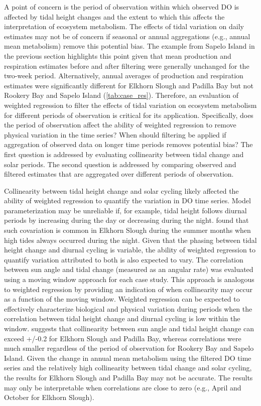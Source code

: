 \documentclass[letterpaper,12pt,oneside]{article}\usepackage[]{graphicx}\usepackage[]{color}
\begin{document}
A point of concern is the period of observation within which observed \ac{DO} is affected by tidal height changes and the extent to which this affects the interpretation of ecosystem metabolism.  The effects of tidal variation on daily estimates may not be of concern if seasonal or annual aggregations (e.g., annual mean metabolism) remove this potential bias.  The example from Sapelo Island in the previous section highlights this point given that mean production and respiration estimates before and after filtering were generally unchanged for the two-week period. Alternatively, annual averages of production and respiration estimates were significantly different for Elkhorn Slough and Padilla Bay but not Rookery Bay and Sapelo Island (\cref{tab:case_res}).  Therefore, an evaluation of weighted regression to filter the effects of tidal variation on ecosystem metabolism for different periods of observation is critical for its application.  Specifically, does the period of observation affect the ability of weighted regression to remove physical variation in the time series?  When should filtering be applied if aggregation of observed data on longer time periods removes potential bias?  The first question is addressed by evaluating collinearity between tidal change and solar periods.  The second question is addressed by comparing observed and filtered estimates that are aggregated over different periods of observation.

Collinearity between tidal height change and solar cycling likely affected the ability of weighted regression to quantify the variation in \ac{DO} time series.  Model parameterization may be unreliable if, for example, tidal height follows diurnal periods by increasing during the day or decreasing during the night.  \citet{Nidzieko14} found that such covariation is common in Elkhorn Slough during the summer months when high tides always occurred during the night.  Given that the phasing between tidal height change and diurnal cycling is variable, the ability of weighted regression to quantify variation attributed to both is also expected to vary.   The correlation between sun angle and tidal change (measured as an angular rate) was evaluated using a moving window approach for each case study.  This approach is analogous to weighted regression by providing an indication of when collinearity may occur as a function of the moving window.  Weighted regression can be expected to effectively characterize biological and physical variation during periods when the correlation between tidal height change and diurnal cycling is low within the window.   suggests that collinearity between sun angle and tidal height change can exceed +/-0.2 for Elkhorn Slough and Padilla Bay, whereas correlations were much smaller regardless of the period of observation for Rookery Bay and Sapelo Island.  Given the change in annual mean metabolism using the filtered \ac{DO} time series and the relatively high collinearity between tidal change and solar cycling, the results for Elkhorn Slough and Padilla Bay may not be accurate.  The results may only be interpretable when correlations are close to zero (e.g., April and October for Elkhorn Slough). 
\end{document}

